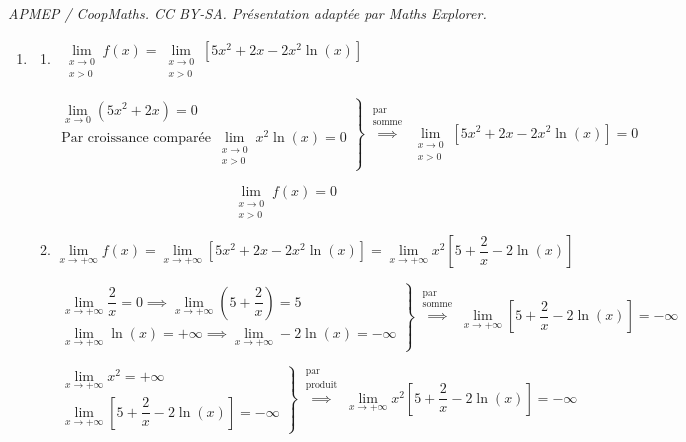 \documentclass[10pt]{article}
\begin{document}
\noindent\textit{APMEP / CoopMaths. CC BY-SA. Présentation adaptée par Maths Explorer.}\par\medskip
\begin{enumerate}
	\item
	\begin{enumerate}
		\item $\begin{gathered}\lim\limits_{\substack{x \to 0\\x>0}}f(x) = \lim\limits_{\substack{x \to 0\\x>0}}\left[5x^2 + 2x - 2x^2\ln(x)\right]\end{gathered}$
		
		\[\left.
		\begin{array}{r}
			\lim\limits_{x \to 0}\left(5x^2+2x\right) = 0\\
			\text{Par croissance comparée}\: \lim\limits_{\substack{x \to 0\\x>0}}x^2\ln(x) = 0
		\end{array}\right\} \overset{\substack{\text{par} \\ \text{somme}}}{\implies} \lim_{\substack{x \to 0\\x>0}}\left[5x^2 + 2x - 2x^2 \ln (x)\right] = 0\]
		
		\[\boxed{\lim_{\substack{x \to 0\\x>0}}f(x) = 0}\]
		\item $\lim\limits_{x \to +\infty}f(x) = \lim\limits_{x \to +\infty}\left[5x^2+2x-2x^2\ln (x)\right] = \lim\limits_{x \to +\infty}x^2\left[5+\dfrac{2}{x}-2\ln(x)\right]$
		
		\[\renewcommand{\arraystretch}{2}
		\left.
		\begin{array}{r}
			\lim\limits_{x \to +\infty}\dfrac{2}{x} = 0 \implies \lim\limits_{x \to +\infty}\left(5+\dfrac{2}{x}\right) = 5 \\
			\lim\limits_{x \to +\infty}\ln(x) = +\infty \implies \lim\limits_{x \to +\infty}-2\ln(x) = -\infty
		\end{array}\right\} \overset{\substack{\text{par} \\ \text{somme}}}{\implies} \lim_{x \to +\infty}\left[5 + \dfrac{2}{x} - 2\ln (x)\right] = -\infty
		\]
		
		\[\renewcommand{\arraystretch}{2}
		\left.
		\begin{array}{r}
			\lim\limits_{x \to +\infty}x^2 = +\infty \\
			\lim\limits_{x \to +\infty}\left[5 + \dfrac{2}{x} - 2\ln (x)\right] = -\infty
		\end{array}\right\} \overset{\substack{\text{par} \\ \text{produit}}}{\implies} \lim_{x \to +\infty}x^2\left[5+\dfrac{2}{x}-2\ln(x)\right] = -\infty
		\]
		

\end{enumerate}
\end{enumerate}
\end{document}
